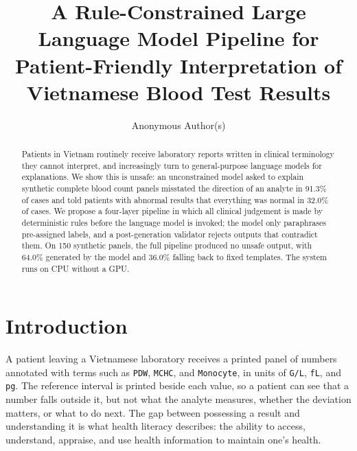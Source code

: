 \documentclass{svproc}
\begin{document}
\mainmatter

\title{A Rule-Constrained Large Language Model Pipeline for
Patient-Friendly Interpretation of Vietnamese Blood Test Results}


\author{Anonymous Author(s)}


\maketitle

\begin{abstract}
Patients in Vietnam routinely receive laboratory reports written in
clinical terminology they cannot interpret, and increasingly turn to
general-purpose language models for explanations. We show this is unsafe:
an unconstrained model asked to explain synthetic complete blood count
panels misstated the direction of an analyte in 91.3\% of cases and told
patients with abnormal results that everything was normal in 32.0\% of
cases. We propose a four-layer pipeline in which all clinical judgement is
made by deterministic rules before the language model is invoked; the model
only paraphrases pre-assigned labels, and a post-generation validator
rejects outputs that contradict them. On 150 synthetic panels, the full
pipeline produced no unsafe output, with 64.0\% generated by the model and
36.0\% falling back to fixed templates. The system runs on CPU without a GPU.
\end{abstract}


\section{Introduction}

A patient leaving a Vietnamese laboratory receives a printed panel of
numbers annotated with terms such as \texttt{PDW}, \texttt{MCHC}, and
\texttt{Monocyte}, in units of \texttt{G/L}, \texttt{fL}, and \texttt{pg}.
The reference interval is printed beside each value, so a patient can see
that a number falls outside it, but not what the analyte measures, whether
the deviation matters, or what to do next. The gap between possessing a
result and understanding it is what health literacy describes: the
ability to access, understand, appraise, and use health information to
maintain one's health.
\end{document}
